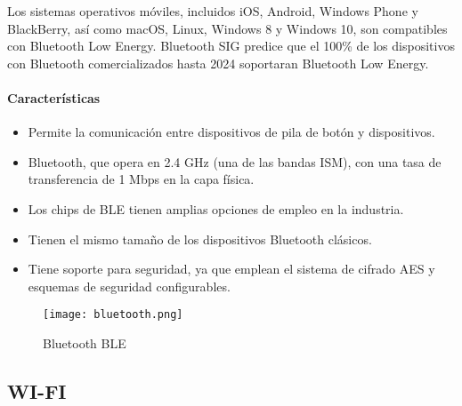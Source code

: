 Los sistemas operativos móviles, incluidos iOS, Android, Windows Phone y BlackBerry, así como macOS,
Linux, Windows 8 y Windows 10, son compatibles con Bluetooth Low Energy. Bluetooth SIG predice que
el 100\% de los dispositivos con Bluetooth comercializados hasta 2024 soportaran Bluetooth Low Energy.

\paragraph{Características}
\begin{itemize}
    \item Permite la comunicación entre dispositivos de pila de botón y dispositivos.
    \item Bluetooth, que opera en 2.4 GHz (una de las bandas ISM), con una tasa de transferencia de 1 Mbps en la capa física.
    \item Los chips de BLE tienen amplias opciones de empleo en la industria.
    \item Tienen el mismo tamaño de los dispositivos Bluetooth clásicos.
    \item Tiene soporte para seguridad, ya que emplean el sistema de cifrado AES y esquemas de seguridad configurables.
\end{itemize}

\begin{figure}[htp!]
    \centering
    \texttt{[image: bluetooth.png]}
    \caption{Bluetooth BLE}
    \label{fig: Bluetooth}
\end{figure}
\FloatBarrier

\subsection{WI-FI}

